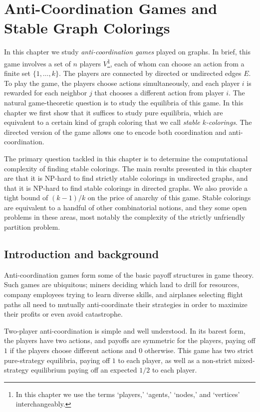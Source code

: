 \chapter{Anti-Coordination Games and Stable Graph Colorings}

In this chapter we study \emph{anti-coordination games} played on graphs. In
brief, this game involves a set of $n$ players $V$\footnote{In this chapter we
use the terms `players,' `agents,' `nodes,' and `vertices' interchangeably.},
each of whom can choose an action from a finite set $\{1, \dots, k \}$. The
players are connected by directed or undirected edges $E$. To play the game,
the players choose actions simultaneously, and each player $i$ is rewarded for
each neighbor $j$ that chooses a different action from player $i$. The natural
game-theoretic question is to study the equilibria of this game. In this
chapter we first show that it suffices to study pure equilibria, which are
equivalent to a certain kind of graph coloring that we call \emph{stable
$k$-colorings}. The directed version of the game allows one to encode both
coordination and anti-coordination.

The primary question tackled in this chapter is to determine the computational
complexity of finding stable colorings. The main results presented in this
chapter are that it is NP-hard to find strictly stable colorings in undirected
graphs, and that it is NP-hard to find stable colorings in directed graphs. We
also provide a tight bound of $(k-1)/k$ on the price of anarchy of this game.
Stable colorings are equivalent to a handful of other combinatorial notions,
and they some open problems in these areas, most notably the complexity of the
strictly unfriendly partition problem.

\section{Introduction and background}

Anti-coordination games form some of the basic payoff structures in game
theory.  Such games are ubiquitous; miners deciding which land to drill for
resources, company employees trying to learn diverse skills, and airplanes
selecting flight paths all need to mutually anti-coordinate their strategies in
order to maximize their profits or even avoid catastrophe.

Two-player anti-coordination is simple and well understood.  In its barest
form, the players have two actions, and payoffs are symmetric for the players,
paying off $1$ if the players choose different actions and $0$ otherwise.  This
game has two strict pure-strategy equilibria, paying off $1$ to each player, as
well as a non-strict mixed-strategy equilibrium paying off an expected $1/2$ to
each player.

